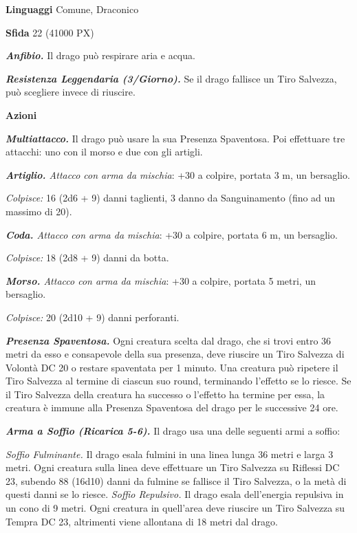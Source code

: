 \begin{multicols}{2}
\textbf{Linguaggi} Comune, Draconico

\textbf{Sfida} 22 (41000 PX)

\textit{\textbf{Anfibio.}} Il drago può respirare aria e acqua.

\textit{\textbf{Resistenza Leggendaria (3/Giorno).}} Se il drago fallisce un Tiro Salvezza, può scegliere invece di riuscire.

\textbf{Azioni}

\textit{\textbf{Multiattacco.}} Il drago può usare la sua Presenza Spaventosa. Poi effettuare tre attacchi: uno con il morso e due con gli artigli.

\textit{\textbf{Artiglio.} Attacco con arma da mischia}: +30 a colpire, portata 3 m, un bersaglio.

\textit{Colpisce:} 16 (2d6 + 9) danni taglienti, 3 danno da Sanguinamento (fino ad un massimo di 20).

\textit{\textbf{Coda.} Attacco con arma da mischia}: +30 a colpire, portata 6 m, un bersaglio.

\textit{Colpisce:} 18 (2d8 + 9) danni da botta.

\textit{\textbf{Morso.} Attacco con arma da mischia}: +30 a colpire, portata 5 metri, un bersaglio.

\textit{Colpisce:} 20 (2d10 + 9) danni perforanti.

\textit{\textbf{Presenza Spaventosa.}} Ogni creatura scelta dal drago, che si trovi entro 36 metri da esso e consapevole della sua presenza, deve riuscire un Tiro Salvezza di Volontà DC 20 o restare spaventata per 1 minuto. Una creatura può ripetere il Tiro Salvezza al termine di ciascun suo round, terminando l'effetto se lo riesce. Se il Tiro Salvezza della creatura ha successo o l'effetto ha termine per essa, la creatura è immune alla Presenza Spaventosa del drago per le successive 24 ore.

\textit{\textbf{Arma a Soffio (Ricarica 5-6).}} Il drago usa una delle seguenti armi a soffio:

\textit{Soffio Fulminante.} Il drago esala fulmini in una linea lunga 36 metri e larga 3 metri. Ogni creatura sulla linea deve effettuare un Tiro Salvezza su Riflessi DC 23, subendo 88 (16d10) danni da fulmine se fallisce il Tiro Salvezza, o la metà di questi danni se lo riesce. \textit{Soffio Repulsivo.} Il drago esala dell'energia repulsiva in un cono di 9 metri. Ogni creatura in quell'area deve riuscire un Tiro Salvezza su Tempra DC 23, altrimenti viene allontana di 18 metri dal
drago.


\end{multicols}
